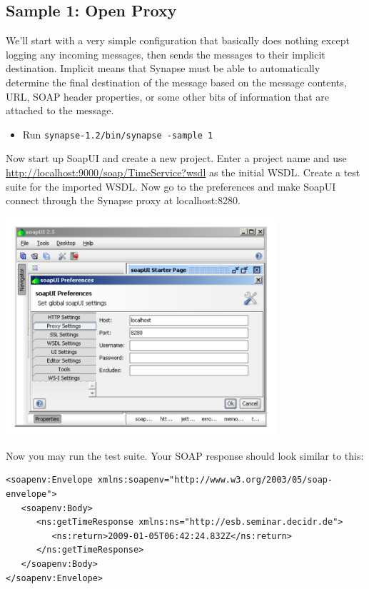 \subsection{Sample 1: Open Proxy}
\label{sec:sample-1}
We'll start with a very simple configuration that basically does nothing except
logging any incoming messages, then sends the messages to their implicit
destination. Implicit means that Synapse must be able to automatically
determine the final destination of the message based on the message contents,
URL, SOAP header properties, or some other bits of information that are attached to
the message.
\begin{itemize}
  \item Run \texttt{synapse-1.2/bin/synapse -sample 1}
\end{itemize}

\lstset{caption=Open proxy configuration, label=sample-1-xml}


Now start up SoapUI and create a new project. Enter a project name and use
\url{http://localhost:9000/soap/TimeService?wsdl} as the initial WSDL.
Create a test suite for the imported WSDL. Now go to the preferences and make
SoapUI connect through the Synapse proxy at localhost:8280.

\begin{center}
\includegraphics[width=10cm]{figures/soapui-proxy.pdf}
\end{center}

Now you may run the test suite. Your SOAP response should look similar to this: 

\lstset{caption=Open proxy configuration, label=sample-1-xml}
\begin{lstlisting}
<soapenv:Envelope xmlns:soapenv="http://www.w3.org/2003/05/soap-envelope">
   <soapenv:Body>
      <ns:getTimeResponse xmlns:ns="http://esb.seminar.decidr.de">
         <ns:return>2009-01-05T06:42:24.832Z</ns:return>
      </ns:getTimeResponse>
   </soapenv:Body>
</soapenv:Envelope>
\end{lstlisting}

